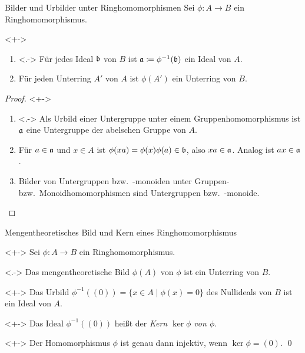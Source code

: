 \begin{frame}{Bilder und Urbilder unter Ringhomomorphismen}
    Sei \(\phi\colon A \to B\) ein Ringhomomorphismus.
    \begin{proposition}<+->
        \begin{enumerate}[<+->]
        \item<.->
            Für jedes Ideal \(\mathfrak{b}\) von \(B\) ist \(\mathfrak{a} \coloneqq
            \phi^{-1}(\mathfrak{b})\) ein Ideal von \(A\).
        \item
            Für jeden Unterring \(A'\) von \(A\) ist \(\phi(A')\) ein Unterring von
            \(B\).        
        \end{enumerate}
    \end{proposition}
    \begin{proof}<+->
        \begin{enumerate}[<+->]
        \item<.->
            Als Urbild einer Untergruppe unter einem Gruppenhomomorphismus ist
            \(\mathfrak{a}\) eine Untergruppe der abelschen Gruppe von
            \(A\).
        \item
            Für \(a \in \mathfrak{a}\) und \(x \in A\) ist \(\phi(x a) = \phi(x)
            \phi(a) \in \mathfrak{b}\), also \(x a \in \mathfrak{a}\). Analog ist
            \(a x \in \mathfrak{a}\).
        \item
            Bilder von Untergruppen bzw.~-monoiden unter
            Gruppen- bzw.~Monoidhomomorphismen sind Untergruppen
            bzw.~-monoide.
            \qedhere
        \end{enumerate}
    \end{proof}
\end{frame}

\begin{frame}{Mengentheoretisches Bild und Kern eines Ringhomomorphismus}
    \begin{visibleenv}<+->
        Sei \(\phi\colon A \to B\) ein Ringhomomorphismus.
    \end{visibleenv}
    \begin{example}<.->
        Das mengentheoretische Bild \(\phi(A)\) von \(\phi\) ist ein Unterring von
        \(B\).
    \end{example}
    \begin{example}<+->
        Das Urbild \(\phi^{-1}((0)) = \{x \in A \mid \phi(x) = 0\}\) des Nullideals
        von \(B\) ist ein Ideal von \(A\).
    \end{example}    
    \begin{definition}<+->    
        Das Ideal \(\phi^{-1}((0))\) heißt der \emph{Kern \(\ker \phi\) von \(\phi\)}.
    \end{definition}   
    \begin{proposition}<+->
        Der Homomorphismus \(\phi\) ist genau dann injektiv, wenn
        \(\ker \phi = (0)\).
        \qed
    \end{proposition}
\end{frame}

